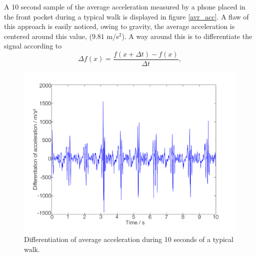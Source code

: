 \documentclass{LTHthesis}
\begin{document}
A 10 second sample of the average acceleration measured by a phone placed in the front pocket during a typical walk is displayed in figure \ref{avr_acc}. A flaw of this approach is easily noticed, owing to gravity, the average acceleration is centered around this value, ($9.81$ m/s$^2$). A way around this is to differentiate the signal according to 
%
\begin{equation}
\Delta f(x) = \frac{f(x+\Delta t) - f(x) }{\Delta t},
\end{equation} 
%
\begin{figure}[!hbt]

\includegraphics[width=1\textwidth ]{images/kinematic/avr_acc_dif}
\caption{Differentiation of average acceleration during 10 seconds of a typical walk.}\label{avr_acc_dif}
\end{figure}
\end{document}
